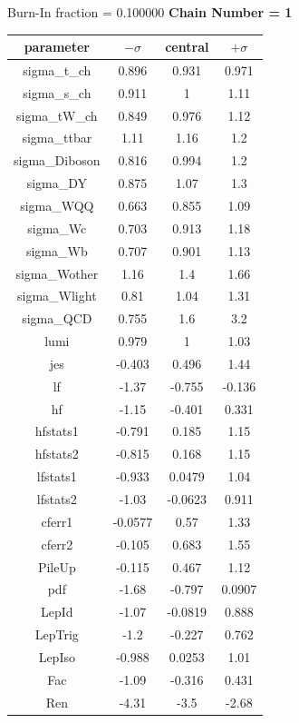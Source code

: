 \documentclass{article}
\begin{document}
 

 \begin{tiny} 
Burn-In fraction = 0.100000
\textbf{ Chain Number = 1} 
\begin{center} 
 \begin{tabular}{ | c | c | c | c |} 
\hline parameter & $-\sigma$ & central & $+\sigma$ \\ 
 \hline 
sigma\_t\_ch & 0.896 & 0.931 & 0.971 \\ 
 sigma\_s\_ch & 0.911 & 1 & 1.11 \\ 
 sigma\_tW\_ch & 0.849 & 0.976 & 1.12 \\ 
 sigma\_ttbar & 1.11 & 1.16 & 1.2 \\ 
 sigma\_Diboson & 0.816 & 0.994 & 1.2 \\ 
 sigma\_DY & 0.875 & 1.07 & 1.3 \\ 
 sigma\_WQQ & 0.663 & 0.855 & 1.09 \\ 
 sigma\_Wc & 0.703 & 0.913 & 1.18 \\ 
 sigma\_Wb & 0.707 & 0.901 & 1.13 \\ 
 sigma\_Wother & 1.16 & 1.4 & 1.66 \\ 
 sigma\_Wlight & 0.81 & 1.04 & 1.31 \\ 
 sigma\_QCD & 0.755 & 1.6 & 3.2 \\ 
 lumi & 0.979 & 1 & 1.03 \\ 
 jes & -0.403 & 0.496 & 1.44 \\ 
 lf & -1.37 & -0.755 & -0.136 \\ 
 hf & -1.15 & -0.401 & 0.331 \\ 
 hfstats1 & -0.791 & 0.185 & 1.15 \\ 
 hfstats2 & -0.815 & 0.168 & 1.15 \\ 
 lfstats1 & -0.933 & 0.0479 & 1.04 \\ 
 lfstats2 & -1.03 & -0.0623 & 0.911 \\ 
 cferr1 & -0.0577 & 0.57 & 1.33 \\ 
 cferr2 & -0.105 & 0.683 & 1.55 \\ 
 PileUp & -0.115 & 0.467 & 1.12 \\ 
 pdf & -1.68 & -0.797 & 0.0907 \\ 
 LepId & -1.07 & -0.0819 & 0.888 \\ 
 LepTrig & -1.2 & -0.227 & 0.762 \\ 
 LepIso & -0.988 & 0.0253 & 1.01 \\ 
 Fac & -1.09 & -0.316 & 0.431 \\ 
 Ren & -4.31 & -3.5 & -2.68 \\ 

\end{tabular}
\end{center}
\end{tiny}
\end{document}
